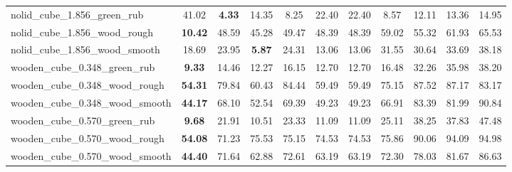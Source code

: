 \begin{table}[H]
{\begin{tabular}{l cccccccccc}
        nolid\_cube\_1.856\_green\_rub & 41.02 & \textbf{4.33} & 14.35 & 8.25 & 22.40 & 22.40 & 8.57 & 12.11 & 13.36 & 14.95 \\
        nolid\_cube\_1.856\_wood\_rough & \textbf{10.42} & 48.59 & 45.28 & 49.47 & 48.39 & 48.39 & 59.02 & 55.32 & 61.93 & 65.53 \\
        nolid\_cube\_1.856\_wood\_smooth & 18.69 & 23.95 & \textbf{5.87} & 24.31 & 13.06 & 13.06 & 31.55 & 30.64 & 33.69 & 38.18 \\
        wooden\_cube\_0.348\_green\_rub & \textbf{9.33} & 14.46 & 12.27 & 16.15 & 12.70 & 12.70 & 16.48 & 32.26 & 35.98 & 38.20 \\
        wooden\_cube\_0.348\_wood\_rough & \textbf{54.31} & 79.84 & 60.43 & 84.44 & 59.49 & 59.49 & 75.15 & 87.52 & 87.17 & 83.17 \\
        wooden\_cube\_0.348\_wood\_smooth & \textbf{44.17} & 68.10 & 52.54 & 69.39 & 49.23 & 49.23 & 66.91 & 83.39 & 81.99 & 90.84 \\
        wooden\_cube\_0.570\_green\_rub & \textbf{9.68} & 21.91 & 10.51 & 23.33 & 11.09 & 11.09 & 25.11 & 38.25 & 37.83 & 47.48 \\
        wooden\_cube\_0.570\_wood\_rough & \textbf{54.08} & 71.23 & 75.53 & 75.15 & 74.53 & 74.53 & 75.86 & 90.06 & 94.09 & 94.98 \\
        wooden\_cube\_0.570\_wood\_smooth & \textbf{44.40} & 71.64 & 62.88 & 72.61 & 63.19 & 63.19 & 72.30 & 78.03 & 81.67 & 86.63 \\
        \bottomrule
    \end{tabular}
    }
\end{table}



\vspace{1cm}

\clearpage


